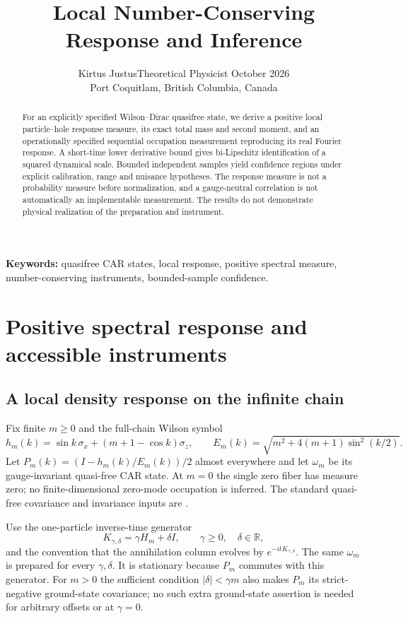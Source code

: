\documentclass[11pt]{article}
\title{Local Number-Conserving Response and Inference}
\author{Kirtus Justus\enspace\textbullet\enspace Theoretical Physicist\enspace\textbullet\enspace 23 October 2026\\Port Coquitlam, British Columbia, Canada}
\date{}
\theoremstyle{definition}
\begin{document}
\maketitle
\begin{abstract}
For an explicitly specified Wilson--Dirac quasifree state, we derive a positive local particle--hole response measure, its exact total mass and second moment, and an operationally specified sequential occupation measurement reproducing its real Fourier response. A short-time lower derivative bound gives bi-Lipschitz identification of a squared dynamical scale. Bounded independent samples yield confidence regions under explicit calibration, range and nuisance hypotheses. The response measure is not a probability measure before normalization, and a gauge-neutral correlation is not automatically an implementable measurement. The results do not demonstrate physical realization of the preparation and instrument.
\end{abstract}
\noindent\textbf{Keywords:} quasifree CAR states, local response, positive spectral measure, number-conserving instruments, bounded-sample confidence.

\section{Positive spectral response and accessible instruments}
\label{sec:local-response}
\subsection{A local density response on the infinite chain}

Fix finite $m\ge0$ and the full-chain Wilson symbol
\[
 h_m(k)=\sin k\,\sigma_x+(m+1-\cos k)\sigma_z,
 \qquad E_m(k)=\sqrt{m^2+4(m+1)\sin^2(k/2)}.
\]
Let $P_m(k)=(I-h_m(k)/E_m(k))/2$ almost everywhere and let $\omega_m$ be
its gauge-invariant quasi-free CAR state. At $m=0$ the single zero fiber
has measure zero; no finite-dimensional zero-mode occupation is inferred.
The standard quasi-free covariance and invariance inputs are
\cite[Definition 3.1, Lemmas 3.3 and 4.2]{araki}.

Use the one-particle inverse-time generator
\[
 K_{\gamma,\delta}=\gamma H_m+\delta I,
 \qquad \gamma\ge0,\quad\delta\in\mathbb R,
\]
and the convention that the annihilation column evolves by
$e^{-itK_{\gamma,\delta}}$. The same $\omega_m$ is prepared for every
$\gamma,\delta$. It is stationary because $P_m$ commutes with this
generator. For $m>0$ the sufficient condition $|\delta|<\gamma m$ also
makes $P_m$ its strict-negative ground-state covariance; no such extra
ground-state assertion is needed for arbitrary offsets or at $\gamma=0$.
\end{document}
